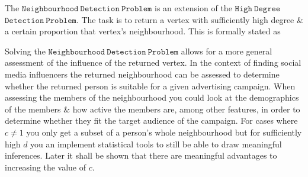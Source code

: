 \documentclass[11pt,twoside,a4paper]{report}
\begin{document}
\par The $\mathtt{Neighbourhood\ Detection\ Problem}$ is an extension of the $\mathtt{High\ Degree}$ $\mathtt{Detection\ Problem}$. The task is to return a vertex with sufficiently high degree \& a certain proportion that vertex's neighbourhood. This is formally stated as
\vspace{.3cm}\begin{adjustwidth}{.3cm}{}\end{adjustwidth}\vspace{.3cm}
\par Solving the $\mathtt{Neighbourhood\ Detection\ Problem}$ allows for a more general assessment of the influence of the returned vertex. In the context of finding social media influencers the returned neighbourhood can be assessed to determine whether the returned person is suitable for a given advertising campaign. When assessing the members of the neighbourhood you could look at the demographics of the members \& how active the members are, among other features, in order to determine whether they fit the target audience of the campaign. For cases where $c\neq 1$ you only get a subset of a person's whole neighbourhood but for sufficiently high $d$ you an implement statistical tools to still be able to draw meaningful inferences. Later it shall be shown that there are meaningful advantages to increasing the value of $c$.
\end{document}
